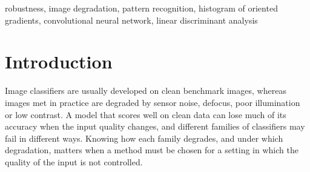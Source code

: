 \documentclass[conference]{IEEEtran}
\begin{document}
\maketitle

\begin{abstract}
Classifiers are normally evaluated on clean test images, yet they are deployed on images affected by noise, blur, poor contrast or exposure shifts.
We compare three pattern-recognition approaches: linear discriminant analysis on pixels (LDA), an RBF support vector machine on
histogram-of-oriented-gradients features (SVM+HOG), and a small convolutional neural network (CNN). Every model is trained and tuned on clean images only,
frozen, and then scored on test images degraded by Gaussian noise, Gaussian blur, contrast reduction and brightness increase at five audited severities.
Two near-duplicate-filtered datasets are used (Fashion-MNIST and ciFAIR-10), all models receive bit-identical degraded images, and differences are assessed with
paired bootstrap intervals and Holm-corrected exact McNemar tests. The CNN is the most accurate model on clean data (0.928 and about 0.80), but this ranking
does not persist under degradation: on Fashion-MNIST it is significantly less accurate than SVM+HOG in 16 of 21 conditions. On Fashion-MNIST, HOG-based models are almost unaffected by
contrast and brightness changes but sensitive to noise, LDA is the most tolerant of noise and blur, and failing models collapse onto a few predicted classes.
The accuracy of the CNN under a single degradation varies by up to 0.12 across training seeds, although its clean accuracy varies by only 0.001.
\end{abstract}

\begin{IEEEkeywords}
robustness, image degradation, pattern recognition, histogram of oriented gradients, convolutional neural network, linear discriminant analysis
\end{IEEEkeywords}

\section{Introduction}
Image classifiers are usually developed on clean benchmark images, whereas images met in practice are degraded by sensor noise, defocus, poor illumination or
low contrast. A model that scores well on clean data can lose much of its accuracy when the input quality changes, and different families of classifiers
may fail in different ways. Knowing how each family degrades, and under which degradation, matters when a method must be chosen for a setting in which the
quality of the input is not controlled.
\end{document}
